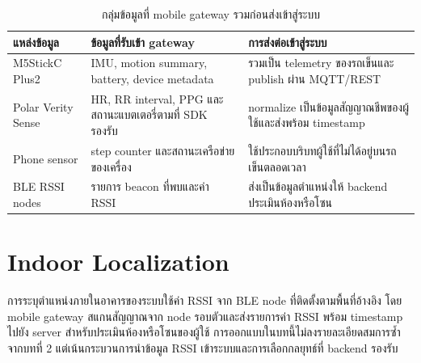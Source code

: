 \begin{table}[H]
    \centering
    \caption{กลุ่มข้อมูลที่ mobile gateway รวมก่อนส่งเข้าสู่ระบบ}
    \label{tab:ch3_mobile_payload}
    \small
    \renewcommand{\arraystretch}{1.25}
    \begin{tabular}{|L{3.2cm}|L{4.7cm}|L{4.7cm}|}
        \hline
        \textbf{แหล่งข้อมูล} & \textbf{ข้อมูลที่รับเข้า gateway} & \textbf{การส่งต่อเข้าสู่ระบบ} \\ \hline
        M5StickC Plus2 & IMU, motion summary, battery, device metadata & รวมเป็น telemetry ของรถเข็นและ publish ผ่าน MQTT/REST \\ \hline
        Polar Verity Sense & HR, RR interval, PPG และสถานะแบตเตอรี่ตามที่ SDK รองรับ & normalize เป็นข้อมูลสัญญาณชีพของผู้ใช้และส่งพร้อม timestamp \\ \hline
        Phone sensor & step counter และสถานะเครือข่ายของเครื่อง & ใช้ประกอบบริบทผู้ใช้ที่ไม่ได้อยู่บนรถเข็นตลอดเวลา \\ \hline
        BLE RSSI nodes & รายการ beacon ที่พบและค่า RSSI & ส่งเป็นข้อมูลตำแหน่งให้ backend ประเมินห้องหรือโซน \\ \hline
    \end{tabular}
\end{table}
\FloatBarrier

\section{Indoor Localization}
\label{sec:ch3_localization}
การระบุตำแหน่งภายในอาคารของระบบใช้ค่า RSSI จาก BLE node ที่ติดตั้งตามพื้นที่อ้างอิง โดย mobile gateway สแกนสัญญาณจาก node รอบตัวและส่งรายการค่า RSSI พร้อม timestamp ไปยัง server สำหรับประเมินห้องหรือโซนของผู้ใช้ การออกแบบในบทนี้ไม่ลงรายละเอียดสมการซ้ำจากบทที่ 2 แต่เน้นกระบวนการนำข้อมูล RSSI เข้าระบบและการเลือกกลยุทธ์ที่ backend รองรับ

